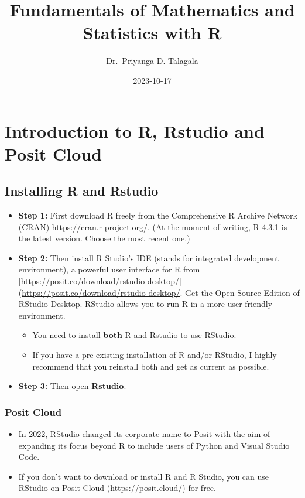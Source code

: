 \documentclass[
]{book}
\title{Fundamentals of Mathematics and Statistics with R}
\author{Dr.~Priyanga D. Talagala}
\date{2023-10-17}
\begin{document}
\maketitle

{
\setcounter{tocdepth}{1}
\tableofcontents
}
\hypertarget{intro}{%
\chapter{Introduction to R, Rstudio and Posit Cloud}\label{intro}}


\hypertarget{installing-r-and-rstudio}{%
\section{Installing R and Rstudio}\label{installing-r-and-rstudio}}

\begin{itemize}
\item
  \textbf{Step 1:} First download R freely from the Comprehensive R Archive Network (CRAN) \url{https://cran.r-project.org/}.
  (At the moment of writing, R 4.3.1 is the latest version. Choose the most recent one.)
\item
  \textbf{Step 2:} Then install R Studio's IDE (stands for integrated development environment), a powerful user interface for R from {[}\url{https://posit.co/download/rstudio-desktop/}{]}(\url{https://posit.co/download/rstudio-desktop/}. Get the Open Source Edition of RStudio Desktop. RStudio allows you to run R in a more user-friendly environment.

  \begin{itemize}
  \item
    You need to install \textbf{both} R and Rstudio to use RStudio.
  \item
    If you have a pre-existing installation of R and/or RStudio, I highly recommend that you reinstall both and get as current as possible.
  \end{itemize}
\item
  \textbf{Step 3:} Then open \textbf{Rstudio}.
\end{itemize}

\hypertarget{posit-cloud}{%
\subsection{Posit Cloud}\label{posit-cloud}}

\begin{itemize}
\item
  In 2022, RStudio changed its corporate name to Posit with the aim of expanding its focus beyond R to include users of Python and Visual Studio Code.
\item
  If you don't want to download or install R and R Studio, you can use RStudio on \protect\hyperlink{posit-cloud}{Posit Cloud} (\url{https://posit.cloud/}) for free.
\end{itemize}
\end{document}
